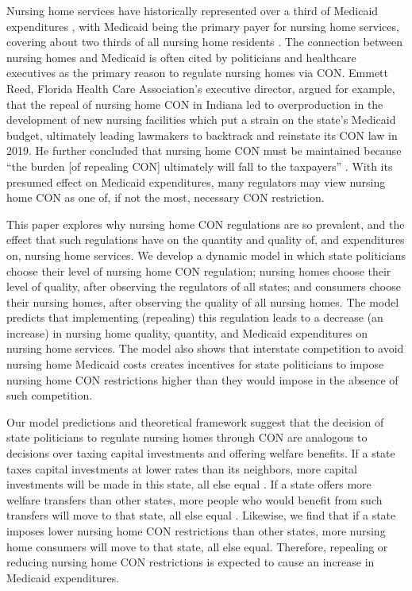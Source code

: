\documentclass[../Main.tex]{subfiles}
\begin{document}
Nursing home services have historically represented over a third of Medicaid expenditures \citep{wiener1999controlling}, with Medicaid being the primary payer for nursing home services, covering about two thirds of all nursing home residents . The connection between nursing homes and Medicaid is often cited by politicians and healthcare executives as the primary reason to regulate nursing homes via CON. Emmett Reed, Florida Health Care Association’s executive director, argued for example, that the repeal of nursing home CON in Indiana led to overproduction in the development of new nursing facilities which put a strain on the state’s Medicaid budget, ultimately leading lawmakers to backtrack and reinstate its CON law in 2019. He further concluded that nursing home CON must be maintained because “the burden [of repealing CON] ultimately will fall to the taxpayers” \citep{sexton2019conrepeal}. With its presumed effect on Medicaid expenditures, many regulators may view nursing home CON as one of, if not the most, necessary CON restriction.

This paper explores why nursing home CON regulations are so prevalent, and the effect that such regulations have on the quantity and quality of, and expenditures on, nursing home services. We develop a dynamic model in which state politicians choose their level of nursing home CON regulation; nursing homes choose their level of quality, after observing the regulators of all states; and consumers choose their nursing homes, after observing the quality of all nursing homes. The model predicts that implementing (repealing) this regulation leads to a decrease (an increase) in nursing home quality, quantity, and Medicaid expenditures on nursing home services. The model also shows that interstate competition to avoid nursing home Medicaid costs creates incentives for state politicians to impose nursing home CON restrictions higher than they would impose in the absence of such competition. 

Our model predictions and theoretical framework suggest that the decision of state politicians to regulate nursing homes through CON are analogous to decisions over taxing capital investments and offering welfare benefits. If a state taxes capital investments at lower rates than its neighbors, more capital investments will be made in this state, all else equal \citep{zodrow1986pigou,bucovetsky1991asymmetric, kanbur1993jeux, basinger2004remodeling, plumper2009there}. If a state offers more welfare transfers than other states, more people who would benefit from such transfers will move to that state, all else equal \citep{gramlich1984migration, peterson1989american, saavedra2000model}. Likewise, we find that if a state imposes lower nursing home CON restrictions than other states, more nursing home consumers will move to that state, all else equal. Therefore, repealing or reducing nursing home CON restrictions is expected to cause an increase in Medicaid expenditures.
\end{document}
